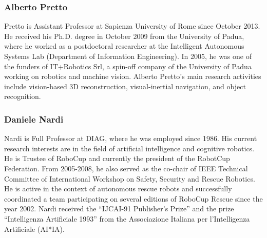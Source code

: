 \documentclass{llncs}
\begin{document}

\subsubsection*{Alberto Pretto}

Pretto is Assistant Professor at Sapienza University of Rome since October 2013. 
He received his Ph.D. degree in October 2009 from the University of Padua, where he worked as a postdoctoral researcher at the Intelligent Autonomous Systems Lab (Department of Information Engineering). 
In 2005, he was one of the funders of IT+Robotics Srl, a spin-off company of the University of Padua working on robotics and machine vision. 
Alberto Pretto's main research activities include vision-based 3D reconstruction, visual-inertial navigation, and object recognition.

\subsubsection*{Daniele Nardi}

Nardi is Full Professor at DIAG, where he was employed since 1986. His current research interests are in the field of artificial intelligence and cognitive robotics. He is Trustee of RoboCup and currently the president of the RobotCup Federation.  From 2005-2008, he also served as the co-chair of IEEE Technical Committee of International Workshop on Safety, Security and Rescue Robotics.  He is active in the context of autonomous rescue robots and successfully coordinated a team participating on several editions of RoboCup Rescue since the year 2002.  
Nardi received the ``IJCAI-91 Publisher's Prize'' and the prize ``Intelligenza Artificiale 1993'' from the Associazione Italiana per l'Intelligenza Artificiale (AI*IA).
\end{document}

